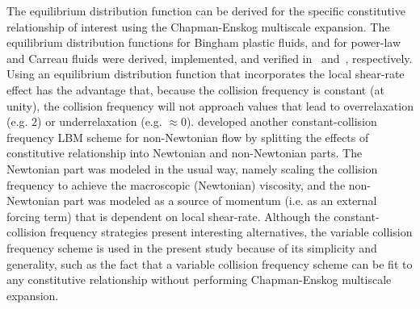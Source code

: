 The equilibrium distribution function can be derived for the specific constitutive relationship of interest using the Chapman-Enskog multiscale expansion.
The equilibrium distribution functions for Bingham plastic fluids, and for power-law and Carreau fluids were derived, implemented, and verified in~\cite{wang2008lattice} and~\cite{yoshino2007numerical}, respectively.
Using an equilibrium distribution function that incorporates the local shear-rate effect has the advantage that, because the collision frequency is constant (at unity), the collision frequency will not approach values that lead to overrelaxation (e.g. $2$) or underrelaxation (e.g. $\approx 0$).
\cite{wang2011lattice} developed another constant-collision frequency LBM scheme for non-Newtonian flow by splitting the effects of constitutive relationship into Newtonian and non-Newtonian parts.
The Newtonian part was modeled in the usual way, namely scaling the collision frequency to achieve the macroscopic (Newtonian) viscosity, and the non-Newtonian part was modeled as a source of momentum (i.e. as an external forcing term) that is dependent on local shear-rate.
Although the constant-collision frequency strategies present interesting alternatives, the variable collision frequency scheme is used in the present study because of its simplicity and generality, such as the fact that a variable collision frequency scheme can be fit to any constitutive relationship without performing Chapman-Enskog multiscale expansion.

